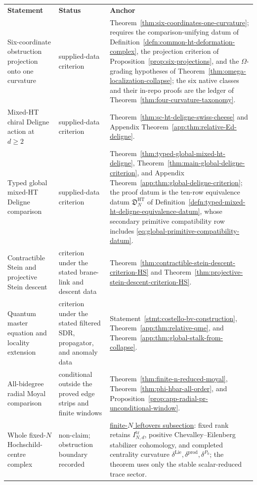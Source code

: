 \begin{center}
\footnotesize
\renewcommand{\arraystretch}{1.15}
\begin{tabular}{@{}>{\raggedright\arraybackslash}p{}
  >{\raggedright\arraybackslash}p{}
  >{\raggedright\arraybackslash}p{}@{}}
\textbf{Statement} & \textbf{Status} & \textbf{Anchor} \\
Six-coordinate obstruction projection onto one curvature &
supplied-data criterion &
Theorem~\ref{thm:six-coordinates-one-curvature}; requires the
comparison-unifying datum of
Definition~\ref{defn:common-ht-deformation-complex}, the projection
criterion of Proposition~\ref{prop:six-projections}, and the
\(\Omega\)-grading hypotheses of
Theorem~\ref{thm:omega-localization-collapse}; the six native classes
and their in-repo proofs are the ledger of
Theorem~\ref{thm:four-curvature-taxonomy}. \\
Mixed-HT chiral Deligne action at \(d\geq2\) &
supplied-data criterion &
Theorem~\ref{thm:sc-ht-deligne-swiss-cheese} and
Appendix Theorem~\ref{app:thm:relative-Ed-deligne}. \\
Typed global mixed-HT Deligne comparison &
supplied-data criterion &
Theorem~\ref{thm:typed-global-mixed-ht-deligne},
Theorem~\ref{thm:main-global-deligne-criterion}, and
Appendix Theorem~\ref{app:thm:global-deligne-criterion}; the proof datum is
the ten-row equivalence datum
\(\mathfrak D^{\mathrm{HT}}_N\) of
Definition~\ref{defn:typed-mixed-ht-deligne-equivalence-datum}, whose
secondary primitive compatibility row includes
\eqref{eq:global-primitive-compatibility-datum}. \\
Contractible Stein and projective Stein descent &
criterion under the stated brane-link and descent data &
Theorem~\ref{thm:contractible-stein-descent-criterion-HS} and
Theorem~\ref{thm:projective-stein-descent-criterion-HS}. \\
Quantum master equation and locality extension &
criterion under the stated filtered SDR, propagator, and anomaly data &
Statement~\ref{stmt:costello-bv-construction},
Theorem~\ref{app:thm:relative-qme}, and
Theorem~\ref{app:thm:global-stalk-from-collapse}. \\
All-bidegree radial Moyal comparison &
conditional outside the proved edge strips and finite windows &
Theorem~\ref{thm:finite-n-reduced-moyal},
Theorem~\ref{thm:phi-hbar-all-order}, and
Proposition~\ref{prop:app-radial-pr-unconditional-window}. \\
Whole fixed-\(N\) Hochschild-centre complex &
non-claim; obstruction boundary recorded &
\hyperref[ssec:finite-N-leftovers]{finite-\(N\) leftovers subsection}:
fixed rank retains
\(I^{\mathrm{tr}}_{N,d}\), positive Chevalley--Eilenberg stabilizer
cohomology, and completed centrality curvature
\(\delta^{\mathrm{Lie}},\delta^{\mathrm{prod}},\delta^{P_0}\);
the theorem uses only the stable scalar-reduced trace sector. \\
\end{tabular}
\end{center}

